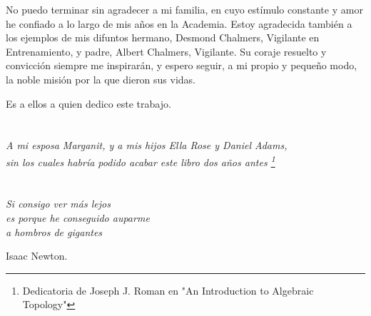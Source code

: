 No puedo terminar sin agradecer a mi familia, en cuyo estímulo constante y amor he confiado a lo largo de mis años en la Academia. Estoy agradecida también a los ejemplos de mis  difuntos hermano, Desmond Chalmers, Vigilante en Entrenamiento, y padre, Albert Chalmers, Vigilante. Su coraje resuelto y convicción siempre me inspirarán, y espero seguir, a mi propio y pequeño modo, la noble misión por la que dieron sus vidas. 

Es a ellos a quien dedico este trabajo.

\cleardoublepage %

\chapter*{}
\setlength{\leftmargin}{0.5\textwidth}
\setlength{\parsep}{0cm}
\addtolength{\topsep}{0.5cm}

\begin{flushright}
	\small\em{
		A mi esposa Marganit, y a mis hijos Ella Rose y Daniel Adams,\\
		sin los cuales habría podido acabar este libro dos años antes \footnote{Dedicatoria de Joseph J. Roman en "An Introduction to Algebraic Topology"}
	}
\end{flushright}


\cleardoublepage %

\chapter*{}

\setlength{\leftmargin}{0.5\textwidth}
\setlength{\parsep}{0cm}
\addtolength{\topsep}{0.5cm}
\begin{flushright}
	\small\em{
		Si consigo ver más lejos\\
		es porque he conseguido auparme\\ 
		a hombros de gigantes
	}
\end{flushright}

\begin{flushright}
	\small{
		Isaac Newton.
	}
\end{flushright}

\cleardoublepage %

